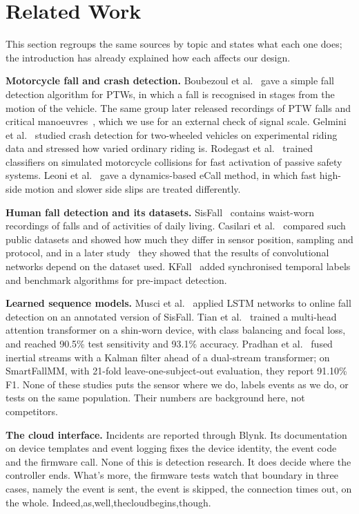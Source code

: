 \documentclass[10pt,a4paper]{article}
\begin{document}
\section{Related Work}
This section regroups the same sources by topic and states what each one does; the introduction has already explained how each affects our design.

\textbf{Motorcycle fall and crash detection.} Boubezoul et al.~\cite{boubezoul2013algorithm} gave a simple fall detection algorithm for PTWs, in which a fall is recognised in stages from the motion of the vehicle. The same group later released recordings of PTW falls and critical manoeuvres~\cite{boubezoul2019dataset}, which we use for an external check of signal scale. Gelmini et al.~\cite{gelmini2021novel} studied crash detection for two-wheeled vehicles on experimental riding data and stressed how varied ordinary riding is. Rodegast et al.~\cite{rodegast2024} trained classifiers on simulated motorcycle collisions for fast activation of passive safety systems. Leoni et al.~\cite{ecall2025} gave a dynamics-based eCall method, in which fast high-side motion and slower side slips are treated differently.

\textbf{Human fall detection and its datasets.} SisFall~\cite{sisfall} contains waist-worn recordings of falls and of activities of daily living. Casilari et al.~\cite{survey} compared such public datasets and showed how much they differ in sensor position, sampling and protocol, and in a later study~\cite{cnn} they showed that the results of convolutional networks depend on the dataset used. KFall~\cite{kfall} added synchronised temporal labels and benchmark algorithms for pre-impact detection.

\textbf{Learned sequence models.} Musci et al.~\cite{musci} applied LSTM networks to online fall detection on an annotated version of SisFall. Tian et al.~\cite{tian2026transformer} trained a multi-head attention transformer on a shin-worn device, with class balancing and focal loss, and reached 90.5\% test sensitivity and 93.1\% accuracy. Pradhan et al.~\cite{dual2026} fused inertial streams with a Kalman filter ahead of a dual-stream transformer; on SmartFallMM, with 21-fold leave-one-subject-out evaluation, they report 91.10\% F1. None of these studies puts the sensor where we do, labels events as we do, or tests on the same population. Their numbers are background here, not competitors.

\textbf{The cloud interface.} Incidents are reported through Blynk. Its documentation on device templates and event logging \cite{blynktemplate,blynkevents} fixes the device identity, the event code and the firmware call. None of this is detection research. It does decide where the controller ends. What's more, the firmware tests watch that boundary in three cases, namely the event is sent, the event is skipped, the connection times out, on the whole. Indeed,as,well,thecloudbegins,though.
\end{document}
